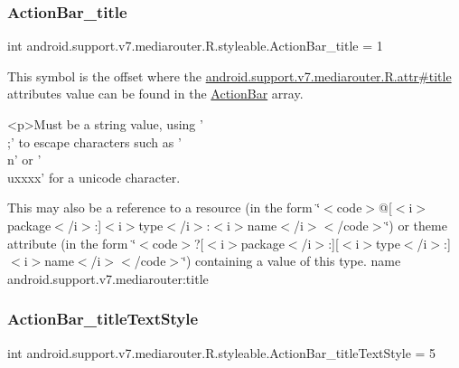 \subsubsection{\texorpdfstring{Action\+Bar\+\_\+title}{ActionBar\_title}}
{\footnotesize\ttfamily int android.\+support.\+v7.\+mediarouter.\+R.\+styleable.\+Action\+Bar\+\_\+title = 1\hspace{0.3cm}{\ttfamily [static]}}

This symbol is the offset where the \hyperlink{classandroid_1_1support_1_1v7_1_1mediarouter_1_1R_1_1attr_a63e7cf1dd1a79d708a4d99098363d8bd}{android.\+support.\+v7.\+mediarouter.\+R.\+attr\#title} attribute\textquotesingle{}s value can be found in the \hyperlink{classandroid_1_1support_1_1v7_1_1mediarouter_1_1R_1_1styleable_adc4d3c0d096085367f12d025007aa53f}{Action\+Bar} array.

\begin{DoxyVerb}      <p>Must be a string value, using '\\;' to escape characters such as '\\n' or '\\uxxxx' for a unicode character.
\end{DoxyVerb}
 

This may also be a reference to a resource (in the form \char`\"{}$<$code$>$@\mbox{[}$<$i$>$package$<$/i$>$\+:\mbox{]}$<$i$>$type$<$/i$>$\+:$<$i$>$name$<$/i$>$$<$/code$>$\char`\"{}) or theme attribute (in the form \char`\"{}$<$code$>$?\mbox{[}$<$i$>$package$<$/i$>$\+:\mbox{]}\mbox{[}$<$i$>$type$<$/i$>$\+:\mbox{]}$<$i$>$name$<$/i$>$$<$/code$>$\char`\"{}) containing a value of this type.  name android.\+support.\+v7.\+mediarouter\+:title \mbox{\label{classandroid_1_1support_1_1v7_1_1mediarouter_1_1R_1_1styleable_a9d4f61dfa42033f224cea9f4b48972b9}} 
\subsubsection{\texorpdfstring{Action\+Bar\+\_\+title\+Text\+Style}{ActionBar\_titleTextStyle}}
{\footnotesize\ttfamily int android.\+support.\+v7.\+mediarouter.\+R.\+styleable.\+Action\+Bar\+\_\+title\+Text\+Style = 5\hspace{0.3cm}{\ttfamily [static]}}

